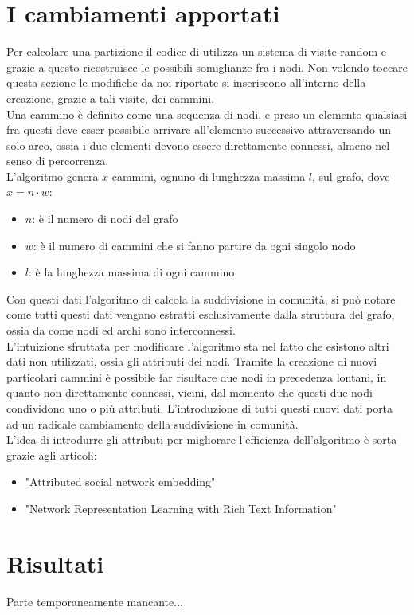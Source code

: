 \section{I cambiamenti apportati}
Per calcolare una partizione il codice di \cnrl utilizza un sistema di visite random e grazie a questo ricostruisce le possibili somiglianze fra i nodi. Non volendo toccare questa sezione le modifiche da noi riportate si inseriscono all'interno della creazione, grazie a tali visite, dei cammini.\\
Una cammino è definito come una sequenza di nodi, e preso un elemento qualsiasi fra questi deve esser possibile arrivare all'elemento successivo attraversando un solo arco, ossia i due elementi devono essere direttamente connessi, almeno nel senso di percorrenza.\\
L'algoritmo genera $x$ cammini, ognuno di lunghezza massima $l$, sul grafo, dove $x=n \cdot w$:
\begin{itemize}
	\item $n$: è il numero di nodi del grafo
	\item $w$: è il numero di cammini che si fanno partire da ogni singolo nodo
	\item $l$: è la lunghezza massima di ogni cammino
\end{itemize}
%
Con questi dati l'algoritmo di \cnrl calcola la suddivisione in comunità, si può notare come tutti questi dati vengano estratti esclusivamente dalla struttura del grafo, ossia da come nodi ed archi sono interconnessi.\\
L'intuizione sfruttata per modificare l'algoritmo sta nel fatto che esistono altri dati non utilizzati, ossia gli attributi dei nodi. Tramite la creazione di nuovi particolari cammini è possibile far risultare due nodi in precedenza lontani, in quanto non direttamente connessi, vicini, dal momento che questi due nodi condividono uno o più attributi. L'introduzione di tutti questi nuovi dati porta ad un radicale cambiamento della suddivisione in comunità.\\
L'idea di introdurre gli attributi per migliorare l'efficienza dell'algoritmo è sorta grazie agli articoli:
\begin{itemize}
	\item "Attributed social network embedding"\cite{SNE_paper}
	\item "Network Representation Learning with Rich Text Information"\cite{TADW_paper}
\end{itemize}
%
\section{Risultati}
Parte temporaneamente mancante...
\newpage
%



